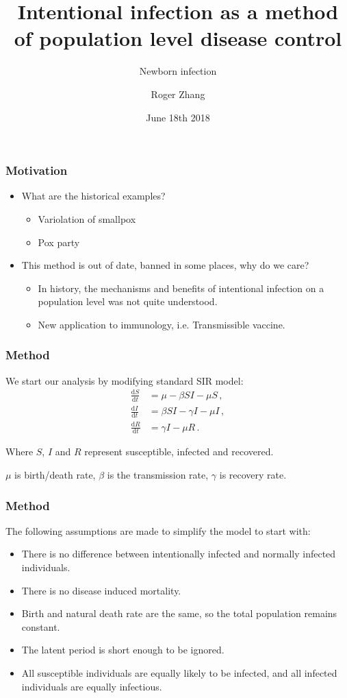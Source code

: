 \documentclass{beamer}
\title{Intentional infection as a method of population level disease control}
\subtitle{Newborn infection}
\author{Roger Zhang}
\date{June 18th 2018}
\institute{McMaster University Department of Mathematics}
\newcommand\dbyd[2]{\frac{\mathrm d{#1}}{\mathrm d{#2}}}
\begin{document}
\begin{frame}
\titlepage
\end{frame}
\begin{frame}
\frametitle{Motivation}
\begin{itemize}
\item What are the historical examples?
\pause
\begin{itemize}
\item Variolation of smallpox
\item Pox party
\end{itemize}
\pause
\item This method is out of date, banned in some places, why do we care?
\pause
\begin{itemize}
\item In history, the mechanisms and benefits of intentional infection  on a population level was not quite understood.
\item New application to immunology, i.e. Transmissible vaccine.
\end{itemize}
\end{itemize}
\end{frame}
\begin{frame}
\frametitle{Method}
We start our analysis by modifying standard SIR model:
\pause
\begin{equation}\label{1}
\begin{split}
\dbyd{S}{t}&=\mu- \beta SI-\mu S \,,\\
\dbyd{I}{t}&=\beta SI-\gamma I -\mu I\,,\\
\dbyd{R}{t}&=\gamma I-\mu R\,.
\end{split}
\end{equation}

Where $S$, $I$ and $R$ represent susceptible, infected and recovered.

$\mu$ is birth/death rate, $\beta$ is the transmission rate, $\gamma$ is recovery rate. 
\end{frame}
\begin{frame}
\frametitle{Method}
The following assumptions are made to simplify the model to start with:
\begin{itemize}
\item There is no difference between intentionally infected and normally infected individuals.
\item There is no disease induced mortality.
\item Birth and natural death rate are the same, so the total population remains constant.
\item The latent period is short enough to be ignored.
\item All susceptible individuals are equally likely to be infected, and all infected individuals are equally infectious.
\end{itemize}
\end{frame}
\end{document}
